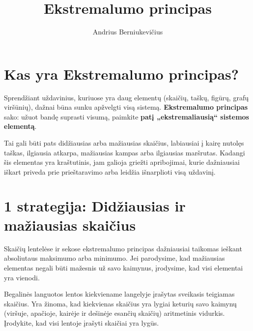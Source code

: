 \documentclass[11pt,a4paper]{scrartcl}
\title{Ekstremalumo principas}
\author{Andrius Berniukevičius}
\begin{document}
\maketitle

\section{Kas yra Ekstremalumo principas?}

Sprendžiant uždavinius, kuriuose yra daug elementų (skaičių, taškų, figūrų, grafų viršūnių), dažnai būna sunku apžvelgti visą sistemą. \textbf{Ekstremalumo principas} sako: užuot bandę suprasti visumą, paimkite \textbf{patį „ekstremaliausią“ sistemos elementą}. 

Tai gali būti pats didžiausias arba mažiausias skaičius, labiausiai į kairę nutolęs taškas, ilgiausia atkarpa, mažiausias kampas arba ilgiausias maršrutas. Kadangi šis elementas yra kraštutinis, jam galioja griežti apribojimai, kurie dažniausiai iškart priveda prie prieštaravimo arba leidžia išnarplioti visą uždavinį.

\section{1 strategija: Didžiausias ir mažiausias skaičius}

Skaičių lentelėse ir sekose ekstremalumo principas dažniausiai taikomas ieškant absoliutaus maksimumo arba minimumo. Jei parodysime, kad mažiausias elementas negali būti mažesnis už savo kaimynus, įrodysime, kad visi elementai yra vienodi.

\begin{example}
Begalinės languotos lentos kiekviename langelyje įrašytas sveikasis teigiamas skaičius. Yra žinoma, kad kiekvienas skaičius yra lygiai keturių savo kaimynų (viršuje, apačioje, kairėje ir dešinėje esančių skaičių) aritmetinis vidurkis. Įrodykite, kad visi lentoje įrašyti skaičiai yra lygūs.
\end{example}
\end{document}
